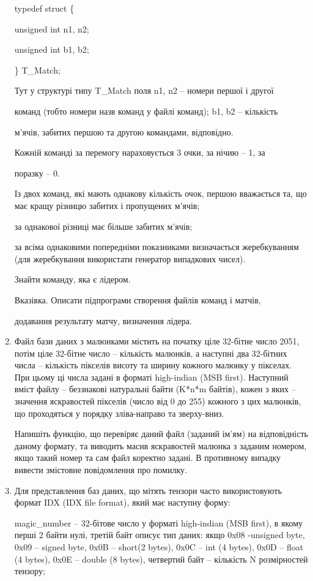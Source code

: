 \documentclass[]{article}
\begin{document}
\begin{enumerate}
typedef struct \{

unsigned int n1, n2;

unsigned int b1, b2;

\} T\_Match;

Тут у структурі типу T\_Match поля n1, n2 -- номери першої і другої

команд (тобто номери назв команд у файлі команд); b1, b2 -- кількість

м'ячів, забитих першою та другою командами, відповідно.

Кожній команді за перемогу нараховується 3 очки, за нічию -- 1, за

поразку -- 0.

Із двох команд, які мають однакову кількість очок, першою вважається та,
що має кращу різницю забитих і пропущених м'ячів;

за однакової різниці має більше забитих м'ячів;

за всіма однаковими попередніми показниками визначається жеребкуванням
(для жеребкування використати генератор випадкових чисел).

Знайти команду, яка є лідером.

Вказівка. Описати підпрограми створення файлів команд і матчів,

додавання результату матчу, визначення лідера.
\item 
Файл бази даних з малюнками містить на початку ціле 32-бітне число 2051,
потім ціле 32-бітне число -- кількість малюнків, а наступні два
32-бітних числа -- кількість пікселів висоту та ширину кожного малюнку у
пікселах. При цьому ці числа задані в форматі high-indian (MSB first).
Наступний вміст файлу -- беззнакові натуральні байти (K*n*m байтів),
кожен з яких -- значення яскравостей пікселів (число від 0 до 255)
кожного з цих малюнків, що проходяться у порядку зліва-направо та
зверху-вниз.

Напишіть функцію, що перевіряє даний файл (заданий ім'ям) на
відповідність даному формату, та виводить масив яскравостей малюнка з
заданим номером, якщо такий номер та сам файл коректно задані. В
противному випадку вивести змістовне повідомлення про помилку.
\item 
Для представлення баз даних, що мітять тензори часто використовують
формат IDX (IDX file format), який має наступну форму:

magic\_number -- 32-бітове число у форматі high-indian (MSB first), в
якому перші 2 байти нулі, третій байт описує тип даних: якщо 0x08
-unsigned byte, 0x09 -- signed byte, 0x0B -- short(2 bytes), 0x0C -- int
(4 bytes), 0x0D -- float (4 bytes), 0x0E -- double (8 bytes), четвертий
байт -- кількість N розмірностей тензору;


\end{enumerate}
\end{document}
